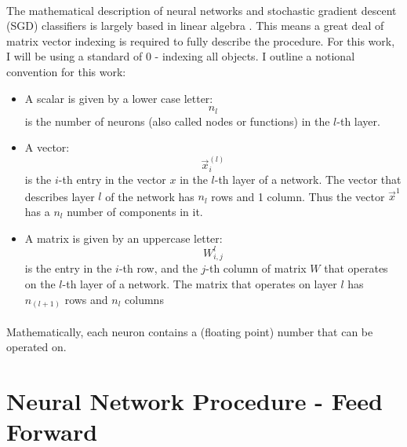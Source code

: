 \documentclass[12pt,letterpaper]{article}
\begin{document}
\paragraph*{}The mathematical description of neural networks and stochastic gradient descent (SGD) classifiers is largely based in linear algebra \cite{Goodfellow}. This means a great deal of matrix vector indexing is required to fully describe the procedure. For this work, I will be using a standard of $0$ - indexing all objects. I outline a notional convention for this work:
\begin{itemize}
\item A scalar is given by a lower case letter:
\begin{equation}
n_l
\end{equation} 
is the number of neurons (also called nodes or functions) in the 
$l$-th layer. 
\item A vector:
\begin{equation}
\vec{x}_{i}^{(l)}
\end{equation}
is the $i$-th entry in the vector $x$ in the $l$-th layer of a network. The vector that describes layer $l$ of the network has $n_l$ rows and 1 column. Thus the vector $\vec{x}^1$ has a $n_l$ number of components in it.
\item A matrix is given by an uppercase letter:
\begin{equation}
W_{i,j}^{{l}}
\end{equation}
is the entry in the $i$-th row, and the $j$-th column of matrix $W$ that operates on the $l$-th layer of a network. The matrix that operates on layer $l$ has $n_{(l+1)}$ rows and $n_{l}$ columns
\end{itemize}
\paragraph*{}Mathematically, each neuron contains a (floating point) number that can be operated on. 


\section{Neural Network Procedure  - Feed Forward}
\end{document}
